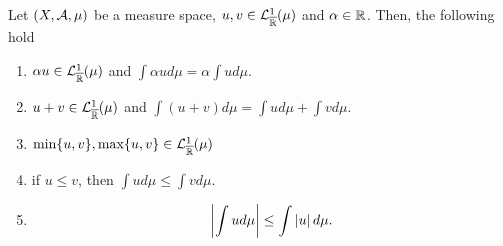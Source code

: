 \begin{thm}
	\label{thm:properties-mu-integral}
	Let $(X, \mathcal{A}, \mu)$ be a measure space, $u, v \in \mathcal{L}_{\overline{\mathbb{R}}}^1(\mu)$ and $\alpha \in \mathbb{R}$. Then, the following hold
	
	\begin{enumerate}
		\item $\alpha u \in \mathcal{L}_{\overline{\mathbb{R}}}^1(\mu)$ and $\int \alpha u d\mu = \alpha \int u d\mu$.
		\item $u + v \in \mathcal{L}_{\overline{\mathbb{R}}}^1(\mu)$ and $\int (u+v)d\mu = \int ud\mu + \int vd\mu$.
		\item $\min\{u, v\}, \max\{u,v\} \in \mathcal{L}_{\overline{\mathbb{R}}}^1(\mu)$
		\item if $u \leq v$, then $\int u d\mu \leq \int v d\mu$.
		\item \begin{align*}
			\left\vert{\int u d\mu}\right\vert \leq \int \left\vert{u}\right\vert d\mu.
		\end{align*}
	\end{enumerate}
\end{thm}

